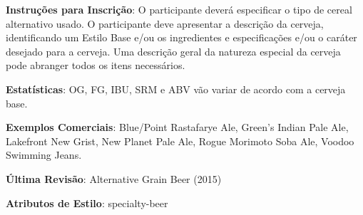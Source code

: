 \textbf{Instruções para Inscrição}: O participante deverá especificar o tipo de cereal alternativo usado. O participante deve apresentar a descrição da cerveja, identificando um Estilo Base e/ou os ingredientes e especificações e/ou o caráter desejado para a cerveja. Uma descrição geral da natureza especial da cerveja pode abranger todos os itens necessários.

\textbf{Estatísticas}: OG, FG, IBU, SRM e ABV vão variar de acordo com a cerveja base.

\textbf{Exemplos Comerciais}: Blue/Point Rastafarye Ale, Green’s Indian Pale Ale, Lakefront New Grist, New Planet Pale Ale, Rogue Morimoto Soba Ale, Voodoo Swimming Jeans.

\textbf{Última Revisão}: Alternative Grain Beer (2015)

\textbf{Atributos de Estilo}: specialty-beer
